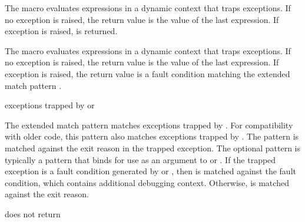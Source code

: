 \begin{syntax}
\end{syntax}
\expandsto{}

The  macro evaluates expressions  
\etc{} in a dynamic context that traps exceptions.  If no exception is
raised, the return value is the value of the last expression. If
exception  is raised,  is
returned.

\begin{syntax}
\end{syntax}
\expandsto{}

The  macro evaluates expressions  
\etc{} in a dynamic context that traps exceptions.  If no exception is
raised, the return value is the value of the last expression. If
exception  is raised, the return value is a fault condition
matching the extended match pattern .

\begin{match-extension}
\end{match-extension}
\matches{} exceptions trapped by  or 

The extended match pattern  matches
exceptions trapped by .
For compatibility with older code, this pattern also matches exceptions
trapped by .
The  pattern is matched against the exit reason in the trapped exception.
The optional  pattern is typically a  pattern that
binds  for use as an argument to  or .
If the trapped exception is a fault condition generated by 
or , then  is
matched against the fault condition, which contains additional debugging context.
Otherwise,  is matched against the exit reason.

\begin{procedure}
\end{procedure}
\returns{} does not return

